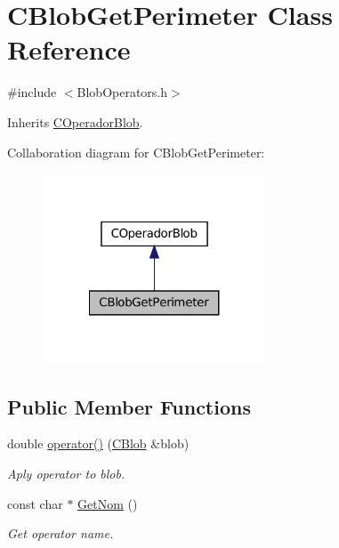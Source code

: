 \hypertarget{class_c_blob_get_perimeter}{
\section{CBlobGetPerimeter Class Reference}
\label{class_c_blob_get_perimeter}
}


{\ttfamily \#include $<$BlobOperators.h$>$}



Inherits \hyperlink{class_c_operador_blob}{COperadorBlob}.



Collaboration diagram for CBlobGetPerimeter:
\nopagebreak
\begin{figure}[H]
\begin{center}
\leavevmode
\includegraphics[width=188pt]{class_c_blob_get_perimeter__coll__graph}
\end{center}
\end{figure}
\subsection*{Public Member Functions}
\begin{DoxyCompactItemize}
\item 
double \hyperlink{class_c_blob_get_perimeter_a27d6922b9fb5ad220bd0e3876aef7f28}{operator()} (\hyperlink{class_c_blob}{CBlob} \&blob)
\begin{DoxyCompactList}\small\item\em Aply operator to blob. \item\end{DoxyCompactList}\item 
const char $\ast$ \hyperlink{class_c_blob_get_perimeter_a035bfb1a62dfc75747ac8c8a61eb3670}{GetNom} ()
\begin{DoxyCompactList}\small\item\em Get operator name. \item\end{DoxyCompactList}\end{DoxyCompactItemize}


